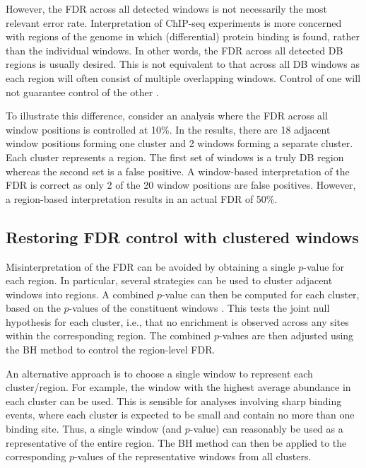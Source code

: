 \documentclass[12pt]{report}
\begin{document}
However, the FDR across all detected windows is not necessarily the most relevant error rate. 
Interpretation of ChIP-seq experiments is more concerned with regions of the genome in which (differential) protein binding is found, rather than the individual windows.
In other words, the FDR across all detected DB regions is usually desired. 
This is not equivalent to that across all DB windows as each region will often consist of multiple overlapping windows.
Control of one will not guarantee control of the other \citep{lun2014}.

To illustrate this difference, consider an analysis where the FDR across all window positions is controlled at 10\%. 
In the results, there are 18 adjacent window positions forming one cluster and 2 windows forming a separate cluster.
Each cluster represents a region. 
The first set of windows is a truly DB region whereas the second set is a false positive. 
A window-based interpretation of the FDR is correct as only 2 of the 20 window positions are false positives.
However, a region-based interpretation results in an actual FDR of 50\%.


\subsection{Restoring FDR control with clustered windows}
Misinterpretation of the FDR can be avoided by obtaining a single $p$-value for each region.
In particular, several strategies can be used to cluster adjacent windows into regions.
A combined $p$-value can then be computed for each cluster, based on the $p$-values of the constituent windows \citep{simes1986}.
This tests the joint null hypothesis for each cluster, i.e., that no enrichment is observed across any sites within the corresponding region. 
The combined $p$-values are then adjusted using the BH method to control the region-level FDR.

An alternative approach is to choose a single window to represent each cluster/region.
For example, the window with the highest average abundance in each cluster can be used.
This is sensible for analyses involving sharp binding events, where each cluster is expected to be small and contain no more than one binding site.
Thus, a single window (and $p$-value) can reasonably be used as a representative of the entire region.
The BH method can then be applied to the corresponding $p$-values of the representative windows from all clusters.
\end{document}
